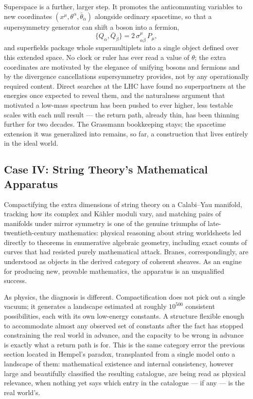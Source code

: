 Superspace is a further, larger step. It promotes the anticommuting variables
to new coordinates $(x^\mu,\theta^\alpha,\bar\theta_{\dot\alpha})$ alongside
ordinary spacetime, so that a supersymmetry generator can shift a boson into a
fermion,
\[
\{Q_\alpha, \bar Q_{\dot\beta}\} = 2\,\sigma^\mu_{\alpha\dot\beta}\,P_\mu ,
\]
and superfields package whole supermultiplets into a single object defined over
this extended space. No clock or ruler has ever read a value of $\theta$; the
extra coordinates are motivated by the elegance of unifying bosons and fermions
and by the divergence cancellations supersymmetry provides, not by any
operationally required content. Direct searches at the LHC have found no
superpartners at the energies once expected to reveal them, and the naturalness
argument that motivated a low-mass spectrum has been pushed to ever higher,
less testable scales with each null result --- the return path, already thin,
has been thinning further for two decades. The Grassmann bookkeeping stays; the
spacetime extension it was generalized into remains, so far, a construction
that lives entirely in the ideal world.

\subsection{Case IV: String Theory's Mathematical Apparatus }

Compactifying the extra dimensions of string theory on a Calabi--Yau manifold,
tracking how its complex and K\"ahler moduli vary, and matching pairs of
manifolds under mirror symmetry is one of the genuine triumphs of
late-twentieth-century mathematics: physical reasoning about string worldsheets
led directly to theorems in enumerative algebraic geometry, including exact
counts of curves that had resisted purely mathematical attack. Branes,
correspondingly, are understood as objects in the derived category of coherent
sheaves. As an engine for producing new, provable mathematics, the apparatus is
an unqualified success.

As physics, the diagnosis is different. Compactification does not pick out a
single vacuum; it generates a landscape estimated at roughly $10^{500}$
consistent possibilities, each with its own low-energy constants. A structure
flexible enough to accommodate almost any observed set of constants after the
fact has stopped constraining the real world in advance, and the capacity to be
wrong in advance is exactly what a return path is for. This is the same
category error the previous section located in Hempel's paradox, transplanted
from a single model onto a landscape of them: mathematical existence and
internal consistency, however large and beautifully classified the resulting
catalogue, are being read as physical relevance, when nothing yet says which
entry in the catalogue --- if any --- is the real world's.

